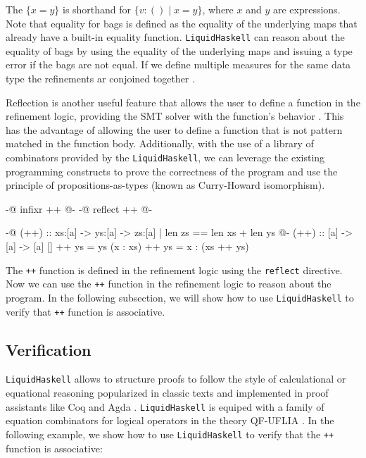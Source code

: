 \documentclass[]{rptuseminar}
\begin{document}

The $\{x = y\}$ is shorthand for $\{ v : () \mid x = y \}$, where $x$ and $y$ are expressions.
Note that equality for bags is defined as the equality of the underlying maps that already have a built-in equality function.
\texttt{LiquidHaskell} can reason about the equality of bags by using the equality of the underlying maps and issuing a type error if the bags are not equal.
If we define multiple measures for the same data type the refinements ar conjoined together \cite{niki_lecture_2024}.



Reflection is another useful feature that allows the user to define a function in the refinement logic, providing
the SMT solver with the function's behavior \cite{vazou_refinement_2018}. 
This has the advantage of allowing the user to define a function that is not pattern matched in the function body.
Additionally, with the use of a library of combinators provided by the \texttt{LiquidHaskell}, we can leverage the existing programming constructs to 
prove the correctness of the program and use the principle of propositions-as-types (known as Curry-Howard isomorphism)\cite{vazou_refinement_2018}\cite{wadler_propositions_2015}.

\begin{haskell}
{-@ infixr ++ @-}
{-@ reflect ++ @-}

{-@ (++) :: xs:[a] -> ys:[a] -> { zs:[a] | len zs == len xs + len ys } @-}
(++) :: [a] -> [a] -> [a]
[] ++ ys = ys
(x : xs) ++ ys = x : (xs ++ ys)
\end{haskell}

The \texttt{++} function is defined in the refinement logic using the \texttt{reflect} directive.
Now we can use the \texttt{++} function in the refinement logic to reason about the program.
In the following subsection, we will show how to use \texttt{LiquidHaskell} to verify that \texttt{++} function is associative.

\subsection{Verification}
\texttt{LiquidHaskell} allows to structure proofs to follow the style of calculational or equational reasoning popularized in classic texts
and implemented in proof assistants like Coq and Agda . \texttt{LiquidHaskell} is equiped with a family of equation combinators
for logical operators in the theory QF-UFLIA \cite{vazou_refinement_2018}.
In the following example, we show how to use \texttt{LiquidHaskell} to verify that the \texttt{++} function is associative:
\end{document}
